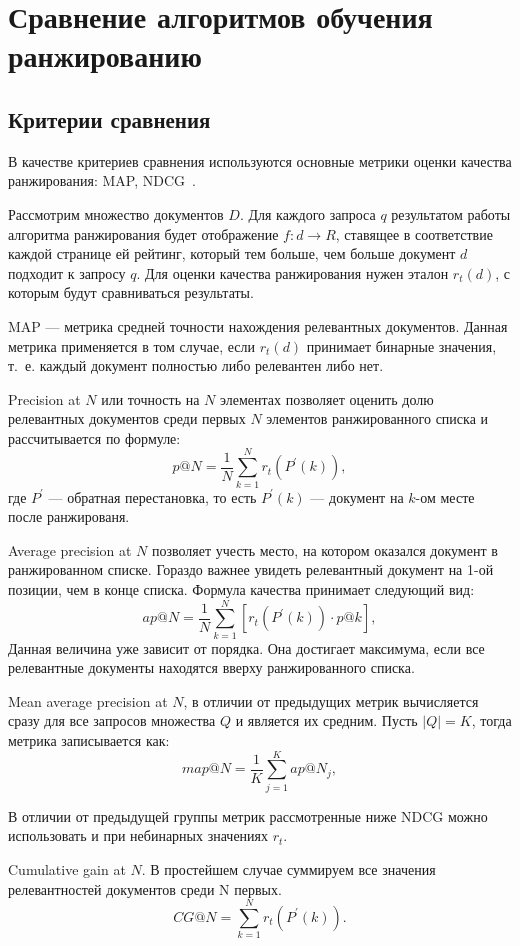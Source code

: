 \chapter{Сравнение алгоритмов обучения ранжированию}

\section{Критерии сравнения}

В качестве критериев сравнения используются основные метрики оценки качества ранжирования: MAP, NDCG~\cite{metrics}. 

Рассмотрим множество документов $D$. Для каждого запроса $q$ результатом работы алгоритма ранжирования будет отображение $f: d \to R$, ставящее в соответствие каждой странице ей рейтинг, который тем больше, чем больше документ $d$ подходит к запросу $q$. Для оценки качества ранжирования нужен эталон $r_t(d)$, с которым будут сравниваться результаты.
 
MAP --- метрика средней точности нахождения релевантных документов. Данная метрика применяется в том случае, если $r_t(d)$ принимает бинарные значения, т.~е. каждый документ полностью либо релевантен либо нет.

Precision at $N$ или точность на $N$ элементах позволяет оценить долю релевантных документов среди первых $N$ элементов ранжированного списка и рассчитывается по формуле:
\[
p @ N=\frac{1}{N} \sum_{k=1}^N r_t(P^{\prime}(k)),
\]
где $P^{\prime}$ --- обратная перестановка, то есть $P^{\prime}(k)$ --- документ на $k$-ом месте после ранжированя.

Average precision at $N$ позволяет учесть место, на котором оказался документ в ранжированном списке. Гораздо важнее увидеть релевантный документ на 1-ой позиции, чем в конце списка. Формула качества принимает
следующий вид: 
\[
ap @ N=\frac{1}{N} \sum_{k=1}^N [r_t(P^{\prime}(k)) \cdot p@k],
\]
Данная величина уже зависит от порядка. Она достигает максимума, если все релевантные документы находятся вверху ранжированного списка.

Mean average precision at $N$, в отличии от предыдущих метрик вычисляется сразу для все запросов множества $Q$ и является их средним. Пусть $|Q| = K$, тогда метрика записывается как:
\[
map @ N=\frac{1}{K} \sum_{j=1}^K ap @ N_j,
\]

В отличии от предыдущей группы метрик рассмотренные ниже NDCG можно использовать и при небинарных значениях $r_t$.

Cumulative gain at $N$. В простейшем случае суммируем все значения релевантностей документов среди N первых.
\[
CG @ N= \sum_{k=1}^N r_t(P^{\prime}(k)).
\] 

